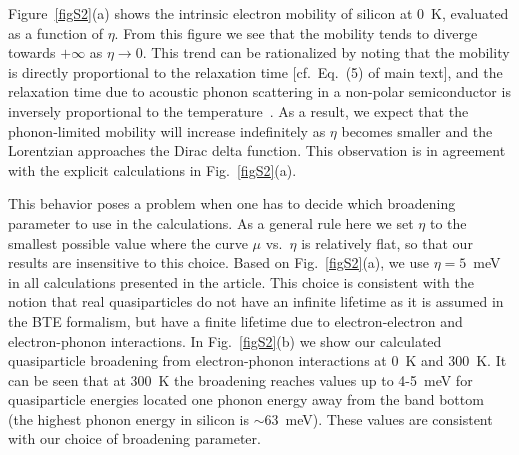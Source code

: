 \documentclass[aps,prl,twocolumn,superscriptaddress]{revtex4-1}
\begin{document}
Figure~\ref{figS2}(a) shows the intrinsic electron mobility of silicon at 0~K, evaluated as a function of $\eta$.
From this figure we see that the mobility tends to diverge towards $+\infty$ as $\eta\rightarrow 0$.
This trend can be rationalized by noting that the mobility is directly proportional to the relaxation
time [cf.\ Eq.~(5) of main text], and the relaxation time due to acoustic phonon scattering in a
non-polar semiconductor is inversely proportional to the temperature~\cite{Bardeen1950}. As a result, we expect that the phonon-limited
mobility will increase indefinitely as $\eta$ becomes smaller and the Lorentzian approaches the Dirac 
delta function. This observation is in agreement with the explicit calculations in Fig.~\ref{figS2}(a).

This behavior poses a problem when one has to decide which broadening parameter to use in the
calculations. As a general rule here we set $\eta$ to the smallest possible value where the
curve $\mu$ vs.\ $\eta$ is relatively flat, so that our results are insensitive to this choice.
Based on Fig.~\ref{figS2}(a), we use $\eta = 5$~meV in all calculations presented in the article. This choice
is consistent with the notion that real quasiparticles do not have an infinite lifetime as it is assumed 
in the BTE formalism, but have a finite lifetime due to electron-electron and electron-phonon interactions.
In Fig.~\ref{figS2}(b) we show our calculated quasiparticle broadening from electron-phonon interactions at
0~K and 300~K. It can be seen that at 300~K the broadening reaches values up to 4-5~meV 
for quasiparticle energies located one phonon energy away from the band bottom (the highest phonon
energy in silicon is $\sim$63~meV). These values are consistent with our choice of broadening parameter.
\end{document}
